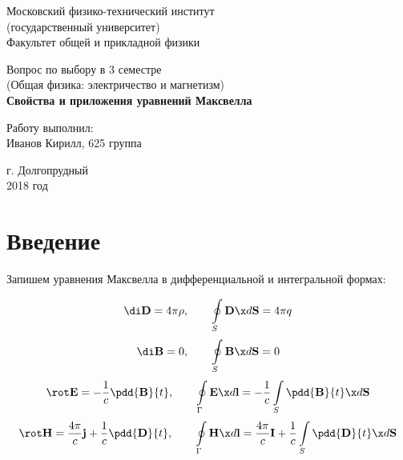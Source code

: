 \documentclass[12pt]{kiarticle}
\begin{document}
	
	\begin{titlepage}
	\begin{center}
		\large 	Московский физико-технический институт \\
		(государственный университет) \\
		Факультет общей и прикладной физики \\
		\vspace{0.2cm}
		
		\vspace{4.5cm}
		Вопрос по выбору в 3 семестре \\ \vspace{0.2cm}
		\large (Общая физика: электричество и магнетизм) \\ \vspace{0.2cm}
		\LARGE \textbf{Свойства и приложения уравнений Максвелла}
	\end{center}
	\vspace{2.3cm} \large
	
	\begin{center}
		Работу выполнил: \\
		Иванов Кирилл,
		625 группа
		\vspace{10mm}		
		
	\end{center}
	
	\begin{center} \vspace{60mm}
		г. Долгопрудный \\
		2018 год
	\end{center}
\end{titlepage}



\section{Введение}

Запишем уравнения Максвелла в дифференциальной и интегральной формах: 

\begin{equation}\label{Gauss_E}
\di \mathbf{D} = 4\pi\rho, \qquad
\oint\limits_S  \mathbf{D} \x d\mathbf{S} = 4\pi q
\end{equation}
\begin{equation}\label{Gauss_B}
\di \textbf{B} = 0 , \qquad
\oint\limits_S  \mathbf{B} \x d\mathbf{S} =  0
\end{equation}
\begin{equation}\label{Faradey}
\rot \mathbf{E} = -\dfrac{1}{c}\pdd{\mathbf{B}}{t}, \qquad \oint\limits_\Gamma \mathbf{E} \x d\mathbf{l} = - \dfrac{1}{c} \int\limits_S  \pdd{\mathbf{B}}{t} \x d\mathbf{S}
\end{equation}
\begin{equation}\label{Circ_H}
\rot \mathbf{H} = \dfrac{4\pi}{c}\mathbf{j} + \dfrac{1}{c}\pdd{\mathbf{D}}{t}, \qquad
\oint\limits_\Gamma \mathbf{H} \x d\mathbf{l} = \dfrac{4\pi}{c}\mathbf{I} + \dfrac{1}{c} \int\limits_S  \pdd{\mathbf{D}}{t} \x d\mathbf{S} 
\end{equation}
\end{document}
